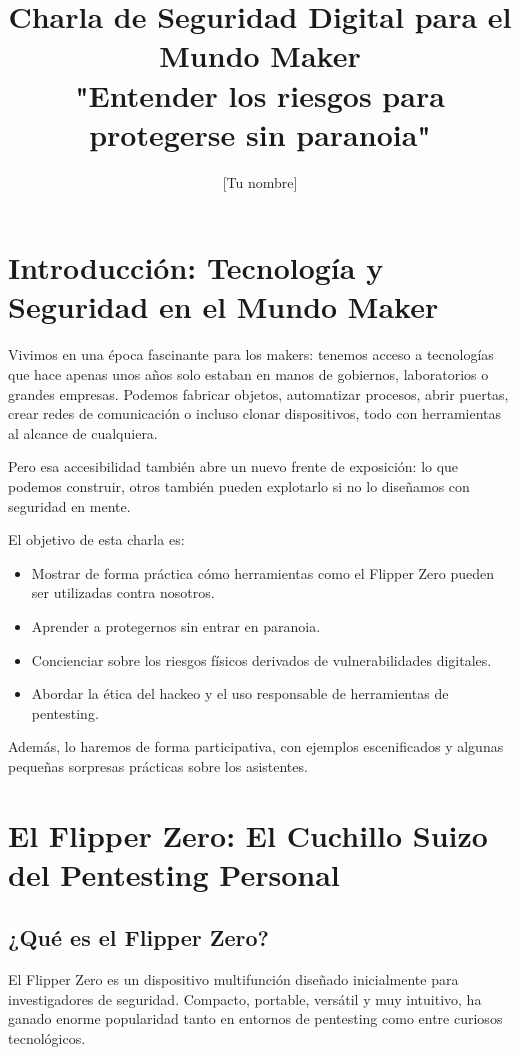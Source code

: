 \documentclass[a4paper,12pt]{article}
\title{\textbf{Charla de Seguridad Digital para el Mundo Maker\\ \large "Entender los riesgos para protegerse sin paranoia"}}
\author{[Tu nombre]}
\date{}
\begin{document}
\maketitle

\tableofcontents
\newpage

\section{Introducción: Tecnología y Seguridad en el Mundo Maker}

Vivimos en una época fascinante para los makers: tenemos acceso a tecnologías que hace apenas unos años solo estaban en manos de gobiernos, laboratorios o grandes empresas. Podemos fabricar objetos, automatizar procesos, abrir puertas, crear redes de comunicación o incluso clonar dispositivos, todo con herramientas al alcance de cualquiera.

Pero esa accesibilidad también abre un nuevo frente de exposición: lo que podemos construir, otros también pueden explotarlo si no lo diseñamos con seguridad en mente.

El objetivo de esta charla es:

\begin{itemize}
    \item Mostrar de forma práctica cómo herramientas como el Flipper Zero pueden ser utilizadas contra nosotros.
    \item Aprender a protegernos sin entrar en paranoia.
    \item Concienciar sobre los riesgos físicos derivados de vulnerabilidades digitales.
    \item Abordar la ética del hackeo y el uso responsable de herramientas de pentesting.
\end{itemize}

Además, lo haremos de forma participativa, con ejemplos escenificados y algunas pequeñas sorpresas prácticas sobre los asistentes.

\section{El Flipper Zero: El Cuchillo Suizo del Pentesting Personal}

\subsection{¿Qué es el Flipper Zero?}

El Flipper Zero es un dispositivo multifunción diseñado inicialmente para investigadores de seguridad. Compacto, portable, versátil y muy intuitivo, ha ganado enorme popularidad tanto en entornos de pentesting como entre curiosos tecnológicos.
\end{document}
